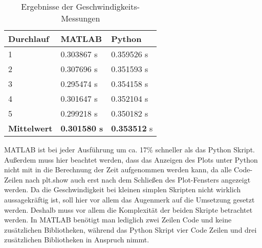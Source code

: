


\begin{table}[H]
	\centering
	\begin{tabular}{|l|l|l|}
		\multicolumn{1}{l}{\textbf{Durchlauf}} & \multicolumn{1}{l}{\textbf{MATLAB}} & \multicolumn{1}{l}{\textbf{Python}}  \\ 
		\hline
		1                                      & 0.303867 s                          & 0.359526
		s                           \\ 
		\hline
		2                                      & 0.307696
		s                          & 0.351593
		s                           \\ 
		\hline
		3                                      & 0.295474
		s                          & 0.354158
		s                           \\ 
		\hline
		4                                      & 0.301647 s                          & 0.352104 s                           \\ 
		\hline
		5                                      & 0.299218 s                          & 0.350182 s                           \\ 
		\hline
		\textbf{Mittelwert}                    & \textbf{0.301580 s}                          & \textbf{0.353512} s                           \\
		\hline
	\end{tabular}
		\caption{Ergebnisse der Geschwindigkeits-Messungen}
\end{table}

MATLAB ist bei jeder Ausführung um ca. 17\% schneller als das Python Skript. Außerdem muss hier beachtet werden, dass das Anzeigen des Plots unter Python nicht mit in die Berechnung der Zeit aufgenommen werden kann, da alle Code-Zeilen nach \glqq plt.show\grqq{} auch erst nach dem Schließen des Plot-Fensters angezeigt werden. Da die Geschwindigkeit bei kleinen simplen Skripten nicht wirklich aussagekräftig ist, soll hier vor allem das Augenmerk auf die Umsetzung gesetzt werden. Deshalb muss vor allem die Komplexität der beiden Skripte betrachtet werden. In MATLAB benötigt man lediglich zwei Zeilen Code und keine zusätzlichen Bibliotheken, während das Python Skript vier Code Zeilen und drei zusätzlichen Bibliotheken in Anspruch nimmt.

